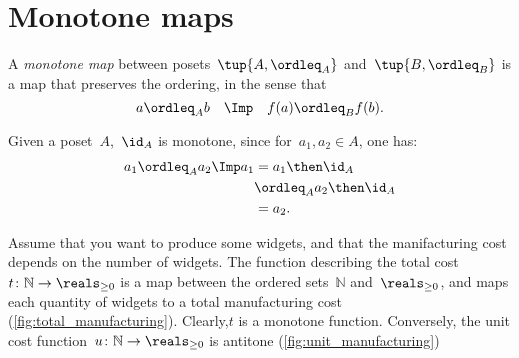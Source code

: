 \section{Monotone maps}

\begin{definition}
A \emph{monotone map} between posets~$\tup{A, \ordleq_A}$ and~$\tup{B, \ordleq_B}$ is a map that preserves the ordering, in the sense that
\begin{equation}
 a \ordleq_A b \quad \Imp \quad f(a) \ordleq_B f(b).
\end{equation}

\begin{comment}\noindent A monotone map is an \emph{isomorphism} if the other direction
of the implication holds as well:
\begin{equation}
 a \leq_A b \quad \Leftrightarrow \quad f(a) \leq_B f(b).
\end{equation}
\end{comment}
\end{definition}
\begin{remark}
Given a poset~$A$,~$\id_A$ is monotone, since for~$a_1,a_2\in A$, one has:
\begin{equation}
\begin{aligned}
a_1\ordleq_A a_2 \Imp a_1&=a_1\then \id_A\\
&\ordleq_A a_2\then \id_A \\
&= a_2.
\end{aligned}
\end{equation}
\end{remark}

\begin{example}
Assume that you want to produce some widgets, and that the manifacturing cost depends on the number of widgets. The function describing the total cost~$t\colon \mathbb{N}\to \reals_{\geq 0}$ is a map between the ordered sets~$\mathbb{N}$ and~$\reals_{\geq 0}$, and maps each quantity of widgets to a total manufacturing cost (\cref{fig:total_manufacturing}). Clearly,$t$ is a monotone function. Conversely, the unit cost function~$u\colon \mathbb{N}\to \reals_{\geq 0}$ is antitone (\cref{fig:unit_manufacturing})
\end{example}

\begin{example}
\end{example}

